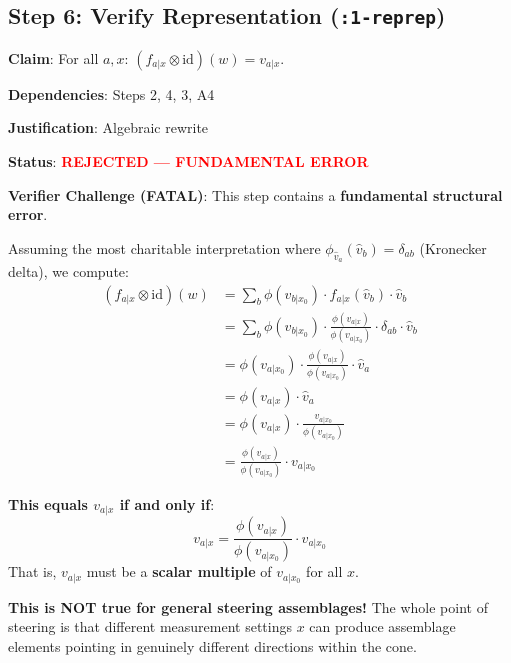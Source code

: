 \documentclass[11pt,a4paper]{article}
\theoremstyle{definition}
\newcommand{\id}{\mathrm{id}}
\begin{document}
\subsection{Step 6: Verify Representation (\texttt{:1-reprep})}

\begin{rejectedbox}
\textbf{Claim}: For all $a, x$: $(f_{a|x} \otimes \id)(w) = v_{a|x}$.

\textbf{Dependencies}: Steps 2, 4, 3, A4

\textbf{Justification}: Algebraic rewrite

\textbf{Status}: \textcolor{red}{\textbf{REJECTED --- FUNDAMENTAL ERROR}}
\end{rejectedbox}

\begin{challengebox}
\textbf{Verifier Challenge (FATAL)}: This step contains a \textbf{fundamental structural error}.

Assuming the most charitable interpretation where $\phi_{\hat{v}_a}(\hat{v}_b) = \delta_{ab}$ (Kronecker delta), we compute:
\begin{align}
(f_{a|x} \otimes \id)(w) &= \sum_b \phi(v_{b|x_0}) \cdot f_{a|x}(\hat{v}_b) \cdot \hat{v}_b \\
&= \sum_b \phi(v_{b|x_0}) \cdot \frac{\phi(v_{a|x})}{\phi(v_{a|x_0})} \cdot \delta_{ab} \cdot \hat{v}_b \\
&= \phi(v_{a|x_0}) \cdot \frac{\phi(v_{a|x})}{\phi(v_{a|x_0})} \cdot \hat{v}_a \\
&= \phi(v_{a|x}) \cdot \hat{v}_a \\
&= \phi(v_{a|x}) \cdot \frac{v_{a|x_0}}{\phi(v_{a|x_0})} \\
&= \frac{\phi(v_{a|x})}{\phi(v_{a|x_0})} \cdot v_{a|x_0}
\end{align}

\textbf{This equals $v_{a|x}$ if and only if}:
\[
v_{a|x} = \frac{\phi(v_{a|x})}{\phi(v_{a|x_0})} \cdot v_{a|x_0}
\]
That is, $v_{a|x}$ must be a \textbf{scalar multiple} of $v_{a|x_0}$ for all $x$.

\textbf{This is NOT true for general steering assemblages!} The whole point of steering is that different measurement settings $x$ can produce assemblage elements pointing in genuinely different directions within the cone.
\end{challengebox}

\end{document}
